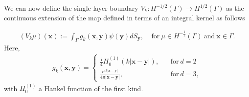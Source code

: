 We can now define the single-layer boundary $V_{k}:H^{-1/2}(\Gamma)\rightarrow H^{1/2}(\Gamma)$ as the continuous extension of the map defined in terms of an integral kernel as follows

\begin{align*}
    (V_{k}\mu)(\boldsymbol{x}) := \int_{\Gamma}g_{k}(\boldsymbol{x},\boldsymbol{y})\psi(\boldsymbol{y})dS_{\boldsymbol{y}}, \ \ \ \ \ 
    \text{for}\ \mu\in H^{-\frac{1}{2}}(\Gamma) \  \text{and} \ \boldsymbol{x}\in\Gamma.
\end{align*}
Here, 
\begin{align}\label{Green's function}
    g_{k}(\boldsymbol{x},\boldsymbol{y}) = \begin{cases}
          \frac{\mathrm{i}}{4}H_{0}^{(1)}(k|\boldsymbol{x}-\boldsymbol{y}|), \ \ \ \ &\text{for} \ d = 2\\
          \frac{e^{ik|\boldsymbol{x}-\boldsymbol{y}|}}{4\pi|\boldsymbol{x} - \boldsymbol{y}|}, \ \ \ \ &\text{for} \ d = 3,
        \end{cases}
\end{align}
with $H_{0}^{(1)}$  a Hankel function of the first kind.



